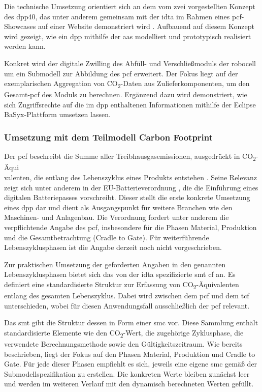 Die technische Umsetzung orientiert sich an dem vom \acs{zvei} vorgestellten Konzept des \acs{dpp40}, das unter anderem gemeinsam mit der \acs{idta} im Rahmen eines \acs{pcf}-Showcases auf einer Website demonstriert wird \cite{PCFShowcas}.
Aufbauend auf diesem Konzept wird gezeigt, wie ein \acs{dpp} mithilfe der \acs{aas} modelliert und prototypisch realisiert werden kann.

Konkret wird der digitale Zwilling des Abfüll- und Verschließmoduls der robocell um ein Submodell zur Abbildung des \acs{pcf} erweitert. 
Der Fokus liegt auf der exemplarischen Aggregation von CO\textsubscript{2}-Daten aus Zulieferkomponenten, um den Gesamt-\acs{pcf} des Moduls zu berechnen. 
Ergänzend dazu wird demonstriert, wie sich Zugriffsrechte auf die im \acs{dpp} enthaltenen Informationen mithilfe der Eclipse BaSyx-Plattform umsetzen lassen.

\subsubsection{Umsetzung mit dem Teilmodell Carbon Footprint}
Der \acs{pcf} beschreibt die Summe aller Treibhausgasemissionen, ausgedrückt in CO\textsubscript{2}-Äqui\\valenten, die entlang des Lebenszyklus eines Produkts entstehen \cite{PCF}. 
Seine Relevanz zeigt sich unter anderem in der EU-Batterieverordnung \cite{EUVerordnung}, die die Einführung eines digitalen Batteriepasses vorschreibt. 
Dieser stellt die erste konkrete Umsetzung eines \acs{dpp} dar und dient als Ausgangspunkt für weitere Branchen wie den Maschinen- und Anlagenbau. 
Die Verordnung fordert unter anderem die verpflichtende Angabe des \acs{pcf}, insbesondere für die Phasen Material, Produktion und die Gesamtbetrachtung (Cradle to Gate). 
Für weiterführende Lebenszyklusphasen ist die Angabe derzeit noch nicht vorgeschrieben.

Zur praktischen Umsetzung der geforderten Angaben in den genannten Lebenszyklusphasen bietet sich das von der \acs{idta} spezifizierte \acs{smt} \acs{cf} \cite{SpezifikaitonPCF} an.
Es definiert eine standardisierte Struktur zur Erfassung von CO\textsubscript{2}-Äquivalenten entlang des gesamten Lebenszyklus.  
Dabei wird zwischen dem \acs{pcf} und dem \ac{tcf} unterschieden, wobei für diesen Anwendungsfall ausschließlich der \acs{pcf} relevant.

Das \acs{smt} gibt die Struktur dessen in Form einer \acs{smc} vor.  
Diese Sammlung enthält standardisierte Elemente wie den CO\textsubscript{2}-Wert, die zugehörige Zyklusphase, die verwendete Berechnungsmethode sowie den Gültigkeitszeitraum.
Wie bereits beschrieben, liegt der Fokus auf den Phasen Material, Produktion und Cradle to Gate.  
Für jede dieser Phasen empfiehlt es sich, jeweils eine eigene \acs{smc} gemäß der Submodellspezifikation zu erstellen.  
Die konkreten Werte bleiben zunächst leer und werden im weiteren Verlauf mit den dynamisch berechneten Werten gefüllt.

